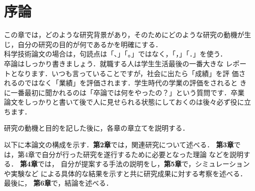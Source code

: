\chapter{序論}

この章では，どのような研究背景があり，そのためにどのような研究の動機が生
じ，自分の研究の目的が何であるかを明確にする．\\

科学技術論文の場合は，句読点は「、」「。」ではなく，「，」「．」を使う．
\\

卒論はしっかり書きましょう．就職する人は学生生活最後の一番大きな
レポートとなります．いつも言っていることですが，社会に出たら「成績」を評
価されるのではなく「業績」を評価されます．学生時代の学業の評価をされると
きに一番最初に聞かれるのは「卒論では何をやったの？」という質問です．卒業
論文をしっかりと書いて後で人に見せられる状態にしておくのは後々必ず役に立
ちます．\\

\vspace{2cm}

研究の動機と目的を記した後に，各章の章立てを説明する．

\vspace{1cm}
以下に本論文の構成を示す．{\bf 第2章}では，関連研究について述べる．
{\bf 第3章}では，第4章で自分が行った研究を遂行するために必要となった理論
などを説明する．
{\bf 第4章}では，
自分が提案する手法の説明をし，{\bf 第5章}で，シミュレーションや実験など
による具体的な結果を示すと共に研究成果に対する考察を述べる．最後に，{\bf
第6章}で，結論を述べる．